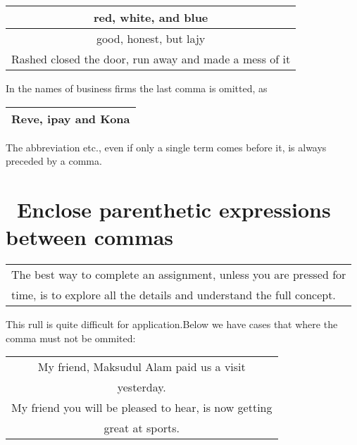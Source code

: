 \documentclass[10pt]{report}
\begin{document}
\begin{table}[!tbh]
    \centering
        \begin{tabular}{|c|}
        \hline
        red, white, and blue\\
        \hline
		good, honest, but lajy\\
		\hline
		Rashed closed the door, run away and made a mess of it\\
		\hline
        \end{tabular}
    
\end{table}

\noindent
In the names of business firms the last comma is omitted, as

\begin{table}[!tbh]
    \centering
        \begin{tabular}{|c|}
        \hline
        Reve, ipay and Kona\\
        \hline
        \end{tabular}
    
\end{table}

The abbreviation etc., even if only a single term comes before it, is always preceded by
a comma.


\section {\bfseries \ Enclose parenthetic expressions between commas}\label{sec:three}

\begin{table}[!tbh]
    \centering
        \begin{tabular}{|l|}
        \hline
        The best way to complete an assignment, unless you are pressed for\\
time, is to explore all the details and understand the full concept.\\
        \hline
        \end{tabular}
    
\end{table}
\noindent
This rull is quite difficult for application.Below we have cases that where the comma must not be ommited:

\begin{table}[!tbh]
    \centering
        \begin{tabular}{|c|}
        \hline
        My friend, Maksudul Alam paid us a visit\\
yesterday.\\
        \hline
        My friend you will be pleased to hear, is now getting\\
great at sports.\\
		\hline
	  
        \end{tabular}
    
\end{table}
\end{document}
